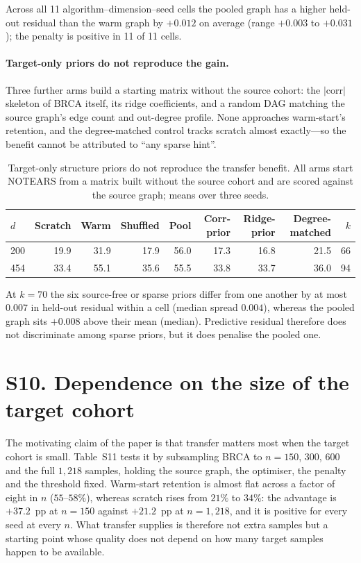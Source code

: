 \documentclass[11pt]{article}
\begin{document}
\noindent Across all 11 algorithm--dimension--seed cells the pooled graph has a higher held-out residual than the warm graph by $+0.012$ on average (range $+0.003$ to $+0.031$); the penalty is positive in 11 of 11 cells.

\paragraph{Target-only priors do not reproduce the gain.} Three further arms build a starting
matrix without the source cohort: the $|\text{corr}|$ skeleton of BRCA itself, its ridge
coefficients, and a random DAG matching the source graph's edge count and out-degree profile.
None approaches warm-start's retention, and the degree-matched control tracks scratch almost
exactly---so the benefit cannot be attributed to ``any sparse hint''.

\setcounter{table}{9}
\begin{table}[h]
\caption{Target-only structure priors do not reproduce the transfer benefit. All arms start NOTEARS from a matrix built without the source cohort and are scored against the source graph; means over three seeds.}
\begin{tabular}{@{}lrrrrrrrr@{}}
\toprule
$d$ & Scratch & Warm & Shuffled & Pool & Corr-prior & Ridge-prior & Degree-matched & $k$\\
\midrule
200 & 19.9 & 31.9 & 17.9 & 56.0 & 17.3 & 16.8 & 21.5 & 66\\
454 & 33.4 & 55.1 & 35.6 & 55.5 & 33.8 & 33.7 & 36.0 & 94\\
\bottomrule
\end{tabular}
\label{tab:S10}
\end{table}

\noindent At $k=70$ the six source-free or sparse priors differ from one another by at most $0.007$ in held-out residual within a cell (median spread $0.004$), whereas the pooled graph sits $+0.008$ above their mean (median). Predictive residual therefore does not discriminate among sparse priors, but it does penalise the pooled one.

\section*{S10. Dependence on the size of the target cohort}

The motivating claim of the paper is that transfer matters most when the target cohort is
small. Table~S11 tests it by subsampling BRCA to $n=150$, $300$, $600$ and the full
$1{,}218$ samples, holding the source graph, the optimiser, the penalty and the threshold
fixed. Warm-start retention is almost flat across a factor of eight in $n$
($55$--$58\%$), whereas scratch rises from $21\%$ to $34\%$: the advantage is $+37.2$~pp at
$n=150$ against $+21.2$~pp at $n=1{,}218$, and it is positive for every seed at every $n$.
What transfer supplies is therefore not extra samples but a starting point whose quality does
not depend on how many target samples happen to be available.
\end{document}
